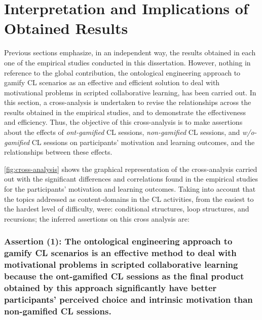 \newpage
\section{Interpretation and Implications of Obtained Results}
\label{sec:interpretation-implications} 

Previous sections emphasize, in an independent way, the results obtained in each one of the empirical studies conducted in this dissertation.
However, nothing in reference to the global contribution, the ontological engineering approach to gamify CL scenarios as an effective and efficient solution to deal with motivational problems in scripted collaborative learning, has been carried out.
In this section, a cross-analysis is undertaken to revise the relationships across the results obtained in the empirical studies, and to demonstrate the effectiveness and efficiency.
Thus, the objective of this cross-analysis is to make assertions about the effects of \emph{ont-gamified} CL sessions, \emph{non-gamified} CL sessions, and \emph{w/o-gamified} CL sessions on participants' motivation and learning outcomes, and the relationships between these effects.

\autoref{fig:cross-analysis} shows the graphical representation of the cross-analysis carried out with the significant differences and correlations found in the empirical studies for the participants' motivation and learning outcomes.
Taking into account that the topics addressed as content-domains in the CL activities, from the easiest to the hardest level of difficulty, were: conditional structures, loop structures, and recursions; the inferred assertions on this cross analysis are:

\subsubsection*{Assertion (1): The ontological engineering approach to gamify CL scenarios is an effective method to deal with motivational problems in scripted collaborative learning because the ont-gamified CL sessions as the final product obtained by this approach significantly have better participants' perceived choice and intrinsic motivation than non-gamified CL sessions.}


